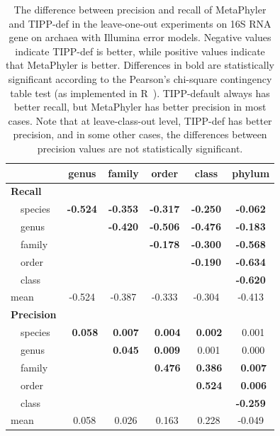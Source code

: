 \begin{table}[hptb]
\caption[Precision-Recall Differences on 16S archaea gene, Illumina]{\label{tipp:difference.leaveout.illumina.archea} The difference between precision and recall of MetaPhyler and TIPP-def in the leave-one-out experiments on 16S RNA
gene on archaea with Illumina error models. Negative values
indicate TIPP-def is better, while positive values indicate that MetaPhyler is better. Differences in bold are statistically significant according to the Pearson's chi-square contingency table test (as implemented in R~\cite{R}). TIPP-default always has better recall, but MetaPhyler has better precision in most cases. Note that at leave-class-out level, TIPP-def has better precision, and in some other cases, the differences between precision values are not statistically significant.}
\begin{center}
\begin{tabular}{|l||c|c|c|c|c|} \hline
\multicolumn{1}{|l||}{}&\multicolumn{1}{c|}{genus}&\multicolumn{1}{c|}{family}&\multicolumn{1}{c|}{order}&\multicolumn{1}{c|}{class}&\multicolumn{1}{c|}{phylum}\\ \hline
{\bf Recall}&&&&&\\
~~species&{\bf -0.524}&{\bf -0.353}&{\bf -0.317}&{\bf -0.250}&{\bf -0.062}\\ 
~~genus&&{\bf -0.420}&{\bf -0.506}&{\bf -0.476}&{\bf -0.183}\\ 
~~family&&&{\bf -0.178}&{\bf -0.300}&{\bf -0.568}\\ 
~~order&&&&{\bf -0.190}&{\bf -0.634}\\ 
~~class&&&&&{\bf -0.620}\\ 
mean&-0.524&-0.387&-0.333&-0.304&-0.413\\ 
\hline
{\bf Precision}&&&&&\\
~~species&{\bf ~0.058}&~{\bf 0.007}&{\bf ~0.004}&{\bf ~0.002}&~0.001\\ 
~~genus&&~{\bf 0.045}&~{\bf 0.009}&~0.001&~0.000\\ 
~~family&&&{\bf ~0.476}&{\bf ~0.386}&{\bf ~0.007}\\ 
~~order&&&&{\bf ~0.524}&{\bf ~0.006}\\ 
~~class&&&&&{\bf -0.259}\\ 
mean&~0.058&~0.026&~0.163&~0.228&-0.049\\ 
\hline
\end{tabular}
\end{center}
\end{table}

